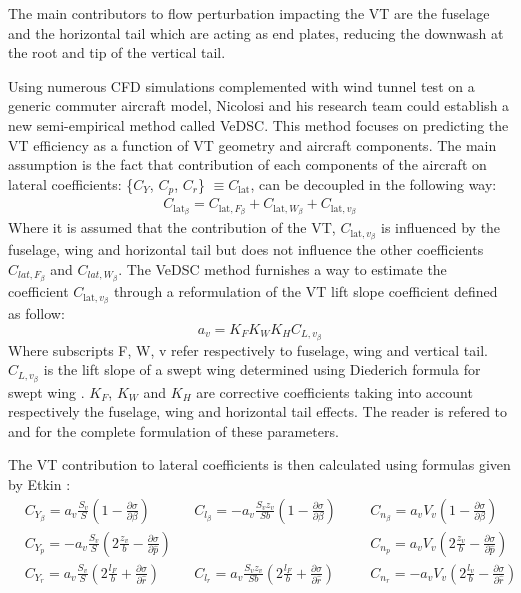 The main contributors to flow perturbation impacting the VT are the fuselage and the horizontal tail which are acting as end plates, reducing the downwash at the root and tip of the vertical tail. 

Using numerous CFD simulations complemented with wind tunnel test on a generic commuter aircraft model, Nicolosi and his research team could establish a new semi-empirical method called VeDSC. This method focuses on predicting the VT efficiency as a function of VT geometry and aircraft components. The main assumption is the fact that contribution of each components of the aircraft on lateral coefficients: \{$C_{Y}$, $C_{p}$, $C_{r}$\} $\equiv C_{\textrm{lat}}$, can be decoupled in the following way:
\begin{eqnarray}
C_{\textrm{lat}_\beta} = C_{\textrm{lat},F_\beta} + C_{\textrm{lat},W_\beta} + C_{\textrm{lat},v_\beta}
\end{eqnarray}
Where it is assumed that the contribution of the VT, $C_{\textrm{lat},v_\beta}$ is influenced by the fuselage, wing and horizontal tail but does not influence the other coefficients $C_{lat,F_\beta}$ and $C_{lat,W_\beta}$.
The VeDSC method furnishes a way to estimate the coefficient $C_{\textrm{lat},v_\beta}$ through a reformulation of the VT lift slope coefficient defined as follow:
\begin{equation}
a_v=K_F K_W K_H C_{L,v_\beta}
\end{equation}
Where subscripts F, W, v refer respectively to fuselage, wing and vertical tail. $C_{L,v_\beta}$ is the lift slope of a swept wing determined using Diederich formula for swept wing \cite{DiederichPlanformParameter}. $K_F$, $K_W$ and $K_H$ are corrective coefficients taking into account respectively the fuselage, wing and horizontal tail effects. The reader is refered to \cite{NicolosiVTDesignReview} and \cite{NicolosiDirectionalStabilityReviewofEmpiricalMethod} for the complete formulation of these parameters.

The VT contribution to lateral coefficients is then calculated using formulas given by Etkin \cite{Etkin}:
\begin{align}
&C_{Y_\beta} = a_v\frac{S_v}{S}\left( 1-\frac{\partial \sigma}{\partial \beta}\right) 
&&C_{l_\beta} =-a_v\frac{S_v z_v}{S b}\left( 1-\frac{\partial \sigma}{\partial \beta}\right) 
&&&C_{n_\beta} = a_v V_v\left( 1-\frac{\partial \sigma}{\partial \beta}\right)\\
&C_{Y_p} = -a_v\frac{S_v}{S}\left(2\frac{z_v}{b}-\frac{\partial \sigma}{\partial \hat{p}}\right) && \qquad &&&C_{n_p}= a_v V_v\left(2\frac{z_v}{b}-\frac{\partial \sigma}{\partial \hat{p}}\right)\\
&C_{Y_r} = a_v\frac{S_v}{S}\left( 2\frac{l_F}{b}+\frac{\partial \sigma}{\partial \hat{r}}\right)  &&C_{l_r} =a_v\frac{S_v z_v}{S b}\left( 2\frac{l_F}{b}+\frac{\partial \sigma}{\partial \hat{r}}\right) &&&C_{n_r} = -a_v V_v\left( 2\frac{l_v}{b}-\frac{\partial \sigma}{\partial \hat{r}}\right)
\end{align}

